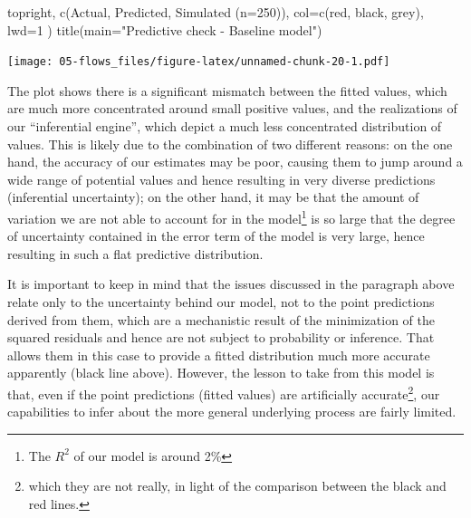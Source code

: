 \documentclass[
]{book}
\newenvironment{Shaded}{\begin{snugshade}}{\end{snugshade}}
\newcommand{\AttributeTok}[1]{\textcolor[rgb]{0.77,0.63,0.00}{#1}}
\newcommand{\DecValTok}[1]{\textcolor[rgb]{0.00,0.00,0.81}{#1}}
\newcommand{\FunctionTok}[1]{\textcolor[rgb]{0.00,0.00,0.00}{#1}}
\newcommand{\NormalTok}[1]{#1}
\newcommand{\StringTok}[1]{\textcolor[rgb]{0.31,0.60,0.02}{#1}}
\begin{document}
\begin{Shaded}
\begin{Highlighting}[]
  \StringTok{\textquotesingle{}topright\textquotesingle{}}\NormalTok{, }
  \FunctionTok{c}\NormalTok{(}\StringTok{\textquotesingle{}Actual\textquotesingle{}}\NormalTok{, }\StringTok{\textquotesingle{}Predicted\textquotesingle{}}\NormalTok{, }\StringTok{\textquotesingle{}Simulated (n=250)\textquotesingle{}}\NormalTok{),}
  \AttributeTok{col=}\FunctionTok{c}\NormalTok{(}\StringTok{\textquotesingle{}red\textquotesingle{}}\NormalTok{, }\StringTok{\textquotesingle{}black\textquotesingle{}}\NormalTok{, }\StringTok{\textquotesingle{}grey\textquotesingle{}}\NormalTok{),}
  \AttributeTok{lwd=}\DecValTok{1}
\NormalTok{)}
\FunctionTok{title}\NormalTok{(}\AttributeTok{main=}\StringTok{"Predictive check {-} Baseline model"}\NormalTok{)}
\end{Highlighting}
\end{Shaded}

\texttt{[image: 05-flows\_files/figure-latex/unnamed-chunk-20-1.pdf]}

The plot shows there is a significant mismatch between the fitted values, which are much more concentrated around small positive values, and the realizations of our ``inferential engine'', which depict a much less concentrated distribution of values. This is likely due to the combination of two different reasons: on the one hand, the accuracy of our estimates may be poor, causing them to jump around a wide range of potential values and hence resulting in very diverse predictions (inferential uncertainty); on the other hand, it may be that the amount of variation we are not able to account for in the model\footnote{The \(R^2\) of our model is around 2\%} is so large that the degree of uncertainty contained in the error term of the model is very large, hence resulting in such a flat predictive distribution.

It is important to keep in mind that the issues discussed in the paragraph above relate only to the uncertainty behind our model, not to the point predictions derived from them, which are a mechanistic result of the minimization of the squared residuals and hence are not subject to probability or inference. That allows them in this case to provide a fitted distribution much more accurate apparently (black line above). However, the lesson to take from this model is that, even if the point predictions (fitted values) are artificially accurate\footnote{which they are not really, in light of the comparison between the black and red lines.}, our capabilities to infer about the more general underlying process are fairly limited.
\end{document}
